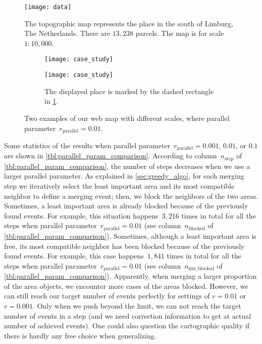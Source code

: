 \documentclass[ijgi,article,submit,moreauthors,pdftex]{Definitions/mdpi}
\begin{document}
\begin{figure}[tb]
\centering
\texttt{[image: data]}
\caption{
    The topographic map represents the place 
    in the south of Limburg, The Netherlands.
    There are $13{,}238$ parcels.
    The map is for scale $1:10{,}000$.}
\label{fig:data}
\end{figure}


\begin{figure}[tb]
\centering
\begin{subfigure}[t]{\textwidth}
\centering
\texttt{[image: case\_study]}
\caption{}
\end{subfigure}
\newline
\vspace{0.3cm}
%
\begin{subfigure}[t]{\textwidth}
\centering
\texttt{[image: case\_study]}
\caption{The displayed place is marked 
    by the dashed rectangle in \fig\ref{fig:data}.}
\end{subfigure}
\caption{Two examples of our web map with different scales,
    where parallel parameter~$r_\mathrm{parallel}= 0.01$.
    }
\label{fig:web_map}
\end{figure}

Some statistics of the results when 
parallel parameter~$r_\mathrm{parallel}=0.001$, $0.01$, or $0.1$ 
are shown in \tbl\ref{tbl:parallel_param_comparison}.
According to column~$n_\mathrm{step}$ of \tbl\ref{tbl:parallel_param_comparison},
the number of steps decreases 
when we use a larger parallel parameter.
As explained in \sect\ref{sec:greedy_algo}, 
for each merging step we iteratively select the least important area 
and its most compatible neighbor to define a merging event; 
then, we block the neighbors of the two areas.
Sometimes, a least important area is already blocked 
because of the previously found events.
For example, this situation happens~$3{,}216$ times in total for all the steps
when parallel parameter~$r_\mathrm{parallel}=0.01$
(see column~$n_\mathrm{blocked}$ of \tbl\ref{tbl:parallel_param_comparison}).
%
Sometimes, although a least important area is free, 
its most compatible neighbor has been blocked 
because of the previously found events.
For example, this case happens~$1{,}841$ times in total for all the steps
when parallel parameter~$r_\mathrm{parallel}=0.01$
(see column~$n_\mathrm{nbr\_blocked}$ of \tbl\ref{tbl:parallel_param_comparison}).
%
Apparently, when merging a larger proportion of 
the area objects, we encounter more cases of the areas blocked.
However, we can still reach our target number of events perfectly 
for settings of $r=0.01$ or $r=0.001$. 
Only when we push beyond the limit, 
we can not reach the target number of events in a step 
(and we need correction information to get at actual number of achieved events). 
One could also question the cartographic quality 
if there is hardly any free choice when generalizing.
\end{document}
